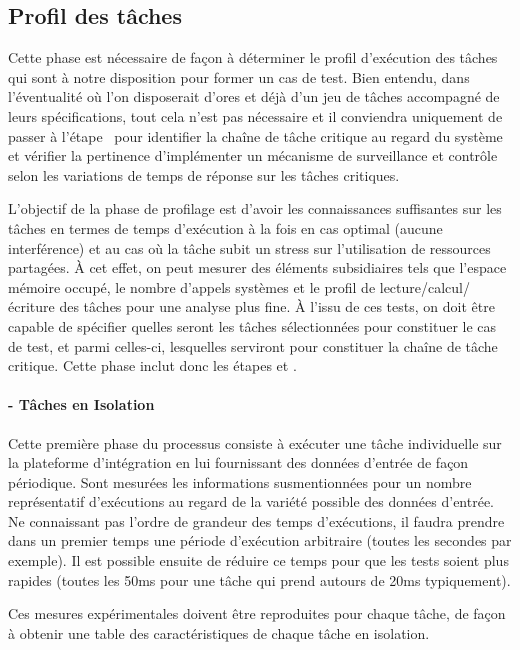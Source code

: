 \documentclass[french, a4paper, 11pt, twoside, pdftex]{StyleThese}
\begin{document}
\subsection{Profil des tâches}
		Cette phase est nécessaire de façon à déterminer le profil d'exécution des tâches qui sont à notre disposition pour former un cas de test. Bien entendu, dans l'éventualité où l'on disposerait d'ores et déjà d'un jeu de tâches accompagné de leurs spécifications, tout cela n'est pas nécessaire et il conviendra uniquement de passer à l'étape~ pour identifier la chaîne de tâche critique au regard du système et vérifier la pertinence d'implémenter un mécanisme de surveillance et contrôle selon les variations de temps de réponse sur les tâches critiques.
		
		L'objectif de la phase de profilage est d'avoir les connaissances suffisantes sur les tâches en termes de temps d'exécution à la fois en cas optimal (aucune interférence) et au cas où la tâche subit un stress sur l'utilisation de ressources partagées. À cet effet, on peut mesurer des éléments subsidiaires tels que l'espace mémoire occupé, le nombre d'appels systèmes et le profil de lecture/calcul/écriture des tâches pour une analyse plus fine. À l'issu de ces tests, on doit être capable de spécifier quelles seront les tâches sélectionnées pour constituer le cas de test, et parmi celles-ci, lesquelles serviront pour constituer la chaîne de tâche critique. Cette phase inclut donc les étapes  et .
		
		\paragraph{ - Tâches en Isolation}
			
			Cette première phase du processus consiste à exécuter une tâche individuelle sur la plateforme d'intégration en lui fournissant des données d'entrée de façon périodique. Sont mesurées les informations susmentionnées pour un nombre représentatif d'exécutions au regard de la variété possible des données d'entrée. 
			Ne connaissant pas l'ordre de grandeur des temps d'exécutions, il faudra prendre dans un premier temps une période d'exécution arbitraire (toutes les secondes par exemple). Il est possible ensuite de réduire ce temps pour que les tests soient plus rapides (toutes les 50ms pour une tâche qui prend autours de 20ms typiquement).
			
			Ces mesures expérimentales doivent être reproduites pour chaque tâche, de façon à obtenir une table des caractéristiques de chaque tâche en isolation.
                    
\end{document}

